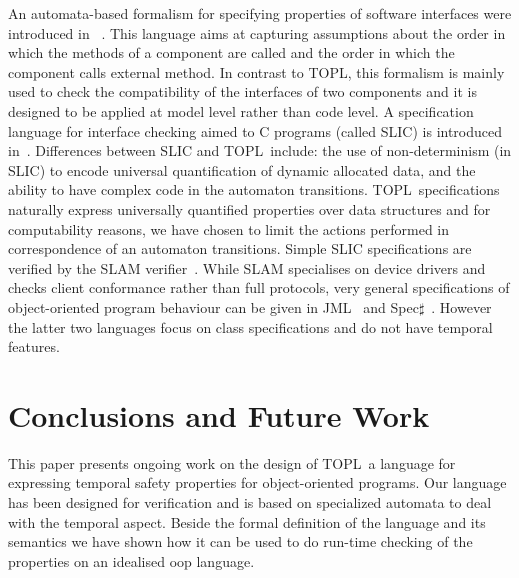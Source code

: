 \documentclass[preprint]{sigplanconf} %
\newcommand{\TPL}{TOPL}
\newcommand{\note}[2]{\textcolor{gray}{[\textcolor{red}{#1}: #2]}}
\newcommand{\rg}[1]{\note{rg}{#1}}
\theoremstyle{definition}
\theoremstyle{remark}
\begin{document}
An automata-based formalism for specifying properties of software interfaces were introduced in~\cite{dblp:conf/sigsoft/AlfaroH01} . 
This language aims at capturing assumptions about the order in which the methods of a component are called and the order in which the component calls external method.
In contrast to \TPL, this formalism is mainly used to check the compatibility of the interfaces of two components and it is designed to be applied at  model level rather than code level. A specification language for interface checking aimed to C programs (called SLIC) is introduced in~\cite{ball2002}.  
Differences between SLIC and \TPL \ include: the use of non-determinism  (in SLIC) to encode universal quantification of dynamic allocated data, and the  ability to have complex code in the automaton transitions. 
\TPL \ specifications naturally express universally quantified properties over data structures and for computability reasons,  we have chosen to limit the  actions performed in correspondence of an automaton transitions. 
Simple SLIC specifications are verified by  the SLAM verifier~\cite{dblp:conf/cav/ballr01}.
While SLAM specialises on device drivers and checks client conformance rather than full protocols, 
very general specifications of object-oriented program behaviour can be given in JML~\cite{jml} and Spec$\sharp$~\cite{DBLP:journals/jot/BarnettDFLS04}. However the latter two languages focus on class specifications and do not have temporal features.




\section{Conclusions and Future Work}\label{sec:conclusions} %
This paper presents ongoing work on the design of  \TPL \ a language for expressing temporal safety properties for object-oriented programs.
Our language has been designed for verification and is based on specialized automata to deal with the temporal aspect.
Beside the formal definition of the language and its semantics we have shown how it can be used to do run-time checking of the properties
on an idealised oop language.
\end{document}
